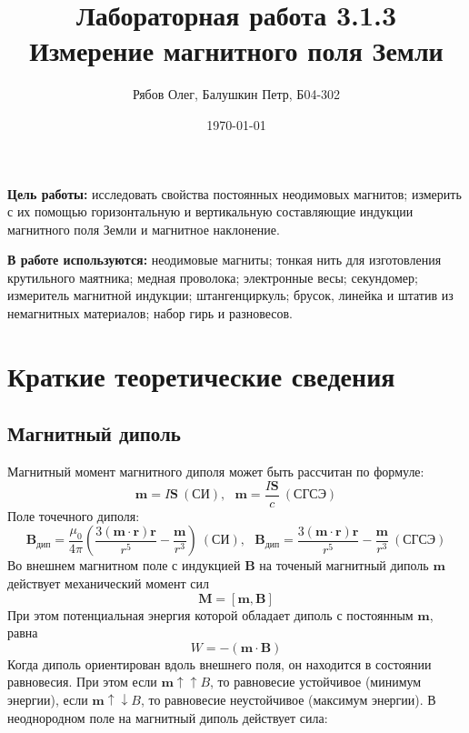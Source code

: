 \documentclass[a4paper, 12pt]{article}
\title{Лабораторная работа 3.1.3 \\ Измерение магнитного поля Земли}
\author{Рябов Олег, Балушкин Петр, Б04-302}
\date{\today}
\begin{document}
	\maketitle
	
	\textbf{Цель работы:} исследовать свойства постоянных неодимовых магнитов; измерить с их помощью горизонтальную и вертикальную составляющие индукции магнитного поля Земли и магнитное наклонение.
	
	\textbf{В работе используются:} неодимовые магниты; тонкая нить для изготовления крутильного маятника; медная проволока; электронные весы; секундомер; измеритель магнитной индукции; штангенциркуль; брусок, линейка и штатив из немагнитных материалов; набор гирь и разновесов.
	
	\section*{Краткие теоретические сведения}
	
	\subsection*{Магнитный диполь}
	Магнитный момент магнитного диполя может быть рассчитан по формуле:
	\[\mathbf{m} = I\mathbf{S} \ (\text{СИ}), \ \ \ \mathbf{m} = \frac{I\mathbf{S}}{c} \ (\text{СГСЭ})\]
	Поле точечного диполя:
	\[\textbf{B}_\text{дип} = \frac{\mu_0}{4\pi}\left(\frac{3(\mathbf{m} \cdot \textbf{r})\textbf{r}}{r^5} - \frac{\textbf{m}}{r^3}\right) \ (\text{СИ}), \ \ \ \textbf{B}_\text{дип} = \frac{3(\mathbf{m} \cdot \textbf{r})\textbf{r}}{r^5} - \frac{\textbf{m}}{r^3} \ (\text{СГСЭ}) \]
	Во внешнем магнитном поле с индукцией $\textbf{B}$ на точеный магнитный диполь $\mathbf{m}$ действует механический момент сил $$\textbf{M}=[\mathbf{m}, \textbf{B}]$$
	При этом потенциальная энергия которой обладает диполь с постоянным $\mathbf{m}$, равна 
	$$W = -(\mathbf{m} \cdot \textbf{B})$$
	Когда диполь ориентирован вдоль внешнего поля, он находится в состоянии равновесия. При этом если $\mathbf{m} \uparrow \uparrow B$, то равновесие устойчивое (минимум энергии), если $\mathbf{m} \uparrow \downarrow B$, то равновесие неустойчивое (максимум энергии).
	В неоднородном поле на магнитный диполь действует сила: 
	
\end{document}
